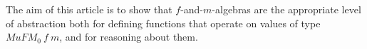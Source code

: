\documentclass{jfp1}
\newcommand{\kw}[1]{\textbf{#1}}
\begin{document}
The aim of this article is to show that $f$-and-$m$-algebras are the
appropriate level of abstraction both for defining functions that
operate on values of type $\mathit{MuFM_0}~f~m$, and for reasoning
about them.



\end{document}
